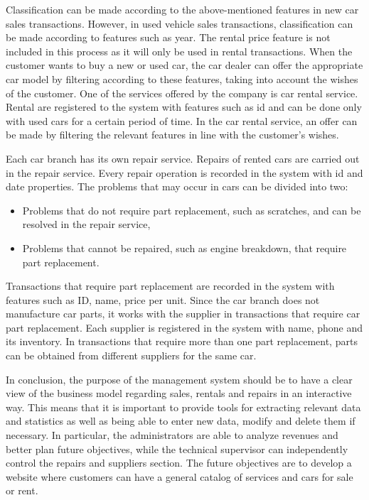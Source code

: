 \medskip

\noindent Classification can be made according to the above-mentioned features in new car sales transactions. However, in used
vehicle sales transactions, classification can be made according to features such as year. The rental price feature is 
not included in this process as it will only be used in rental transactions. When the customer wants to buy a new or used car, 
the car dealer can offer the appropriate car model by filtering according to these features, taking into account the wishes of the customer.
One of the services offered by the company is car rental service. Rental are registered to the system with features such as id and can be done only with used cars
for a certain period of time. In the car rental service, an offer can be made by filtering the relevant features in line with the customer's wishes.

\medskip

\noindent Each car branch has its own repair service. Repairs of rented cars are carried out in the repair service. Every repair operation is 
recorded in the system with id and date properties. The problems that may occur in cars can be divided into two:

\begin{itemize}
	\item Problems that do not require part replacement, such as scratches, and can be resolved in the repair service,
	\item Problems that cannot be repaired, such as engine breakdown, that require part replacement.
\end{itemize}

\noindent Transactions that require part replacement are recorded in the system with features such as ID, name, price per unit. Since the car branch does 
not manufacture car parts, it works with the supplier in transactions that require car part replacement. Each supplier is registered in the system with 
name, phone and its inventory. In transactions that require more than one part replacement, parts can be obtained from different suppliers for the same car.

\medskip

\noindent In conclusion, the purpose of the management system should be to have a clear view of the business model regarding sales, 
rentals and repairs in an interactive way. This means that it is important to provide tools for extracting relevant data and statistics 
as well as being able to enter new data, modify and delete them if necessary.
In particular, the administrators are able to analyze revenues and better plan future objectives, while the technical 
supervisor can independently control the repairs and suppliers section.
The future objectives are to develop a website where customers can have a general catalog of services and cars for sale or rent.
